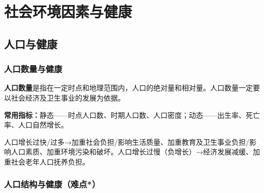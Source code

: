 \chapter{社会环境因素与健康}
\setcounter{chapter}{5}

\section{人口与健康}

\subsection{人口数量与健康}

\begin{defbox}
\textbf{人口数量}是指在一定时点和地理范围内，人口的绝对量和相对量。人口数量一定要以社会经济及卫生事业的发展为依据。

\textbf{常用指标：}静态——时点人口数、时期人口数、人口密度；动态——出生率、死亡率、人口自然增长。

人口增长过快/过多→加重社会负担/影响生活质量、加重教育及卫生事业负担/影响人口素质、加重环境污染和破坏。人口增长过慢（负增长）→经济发展减缓、加重社会老年人口抚养负担。
\end{defbox}

\subsection{人口结构与健康（难点*）}

